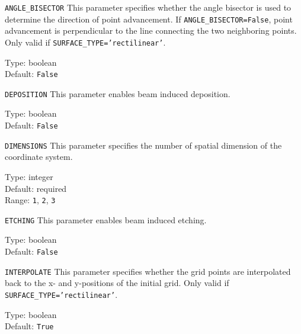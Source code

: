 \begin{keydescription}{\texttt{ANGLE\_BISECTOR}}
This parameter specifies whether the angle bisector is used to determine the 
direction of point advancement. If \texttt{ANGLE\_BISECTOR=False}, point
advancement is perpendicular to the line connecting the two neighboring points.
Only valid if \texttt{SURFACE\_TYPE='rectilinear'}.
\begin{keytab}
   Type:    \> boolean \\
   Default: \> \texttt{False}
\end{keytab}
\end{keydescription}

\begin{keydescription}{\texttt{DEPOSITION}}
This parameter enables beam induced deposition.
\begin{keytab}
   Type:    \> boolean \\
   Default: \> \texttt{False}
\end{keytab}
\end{keydescription}

\begin{keydescription}{\texttt{DIMENSIONS}}
This parameter specifies the number of spatial dimension of the coordinate
system.
\begin{keytab}
   Type:    \> integer \\
   Default: \> required \\
   Range:   \> \texttt{1}, \texttt{2}, \texttt{3}
\end{keytab}
\end{keydescription}

\begin{keydescription}{\texttt{ETCHING}}
This parameter enables beam induced etching.
\begin{keytab}
   Type:    \> boolean \\
   Default: \> \texttt{False}
\end{keytab}
\end{keydescription}

\begin{keydescription}{\texttt{INTERPOLATE}}
This parameter specifies whether the grid points are interpolated back to the 
x- and y-positions of the initial grid. Only valid if
\texttt{SURFACE\_TYPE='rectilinear'}.
\begin{keytab}
   Type:    \> boolean \\
   Default: \> \texttt{True}
\end{keytab}
\end{keydescription}

